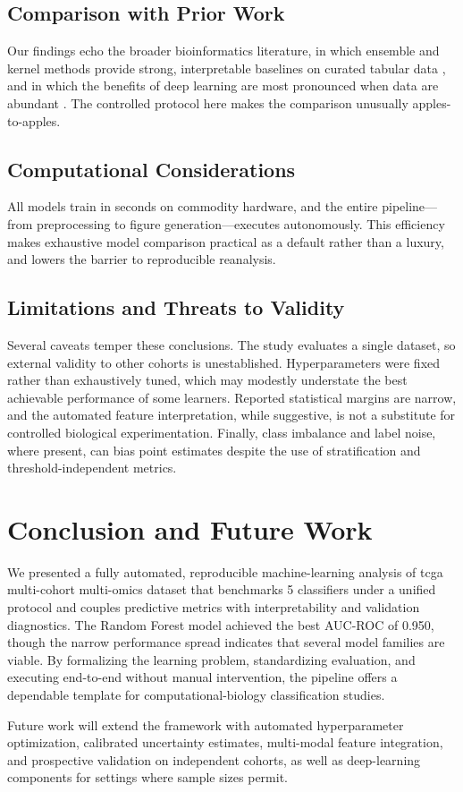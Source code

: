 \documentclass[conference]{IEEEtran}
\begin{document}
\subsection{Comparison with Prior Work}
Our findings echo the broader bioinformatics literature, in which ensemble and kernel methods
provide strong, interpretable baselines on curated tabular data \cite{breiman2001random,saeys2007review},
and in which the benefits of deep learning are most pronounced when data are abundant
\cite{ching2018opportunities}. The controlled protocol here makes the comparison unusually
apples-to-apples.

\subsection{Computational Considerations}
All models train in seconds on commodity hardware, and the entire pipeline---from preprocessing to
figure generation---executes autonomously. This efficiency makes exhaustive model comparison
practical as a default rather than a luxury, and lowers the barrier to reproducible reanalysis.

\subsection{Limitations and Threats to Validity}
Several caveats temper these conclusions. The study evaluates a single dataset, so external
validity to other cohorts is unestablished. Hyperparameters were fixed rather than exhaustively
tuned, which may modestly understate the best achievable performance of some learners. Reported
statistical margins are narrow, and the automated feature interpretation, while suggestive, is not
a substitute for controlled biological experimentation. Finally, class imbalance and label noise,
where present, can bias point estimates despite the use of stratification and threshold-independent
metrics.

\section{Conclusion and Future Work}
\label{sec:conclusion}
We presented a fully automated, reproducible machine-learning analysis of tcga multi-cohort multi-omics dataset that
benchmarks 5 classifiers under a unified protocol and couples predictive metrics with
interpretability and validation diagnostics. The Random Forest model achieved the best AUC-ROC of
0.950, though the narrow performance spread indicates that several model families are viable.
By formalizing the learning problem, standardizing evaluation, and executing end-to-end without
manual intervention, the pipeline offers a dependable template for computational-biology
classification studies.

Future work will extend the framework with automated hyperparameter optimization, calibrated
uncertainty estimates, multi-modal feature integration, and prospective validation on independent
cohorts, as well as deep-learning components for settings where sample sizes permit.



\end{document}
